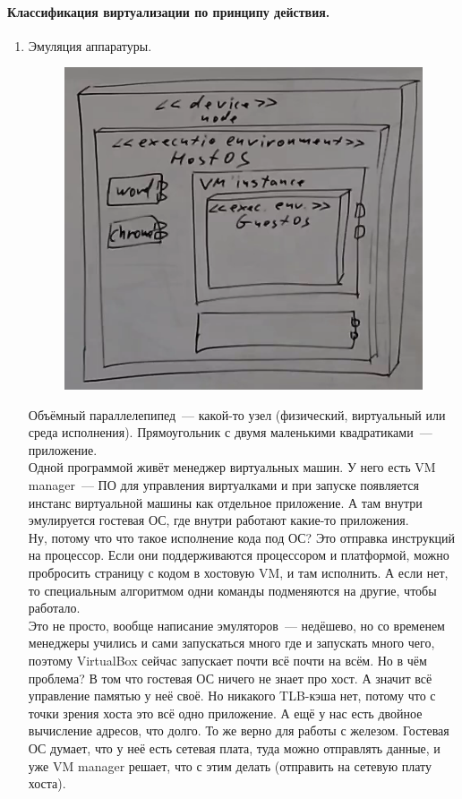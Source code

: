 \documentclass{article}
\begin{document}
    \paragraph{Классификация виртуализации по принципу действия.}
    \begin{enumerate}
        \item Эмуляция аппаратуры.
        \begin{figure}[H]
            \centering
            \includegraphics[width=0.7\linewidth]{Images/screenshot001}
        \end{figure}\noindent
        Объёмный параллелепипед~--- какой-то узел (физический, виртуальный или среда исполнения). Прямоугольник с двумя маленькими квадратиками~--- приложение.\\
        Одной программой живёт менеджер виртуальных машин. У него есть VM manager~--- ПО для управления виртуалками и при запуске появляется инстанс виртуальной машины как отдельное приложение. А там внутри эмулируется гостевая ОС, где внутри работают какие-то приложения.\\
        Ну, потому что что такое исполнение кода под ОС? Это отправка инструкций на процессор. Если они поддерживаются процессором и платформой, можно пробросить страницу с кодом в хостовую VM, и там исполнить. А если нет, то специальным алгоритмом одни команды подменяются на другие, чтобы работало.\\
        Это не просто, вообще написание эмуляторов~--- недёшево, но со временем менеджеры учились и сами запускаться много где и запускать много чего, поэтому VirtualBox сейчас запускает почти всё почти на всём. Но в чём проблема? В том что гостевая ОС ничего не знает про хост. А значит всё управление памятью у неё своё. Но никакого TLB-кэша нет, потому что с точки зрения хоста это всё одно приложение. А ещё у нас есть двойное вычисление адресов, что долго. То же верно для работы с железом. Гостевая ОС думает, что у неё есть сетевая плата, туда можно отправлять данные, и уже VM manager решает, что с этим делать (отправить на сетевую плату хоста).\\

\end{enumerate}
\end{document}
